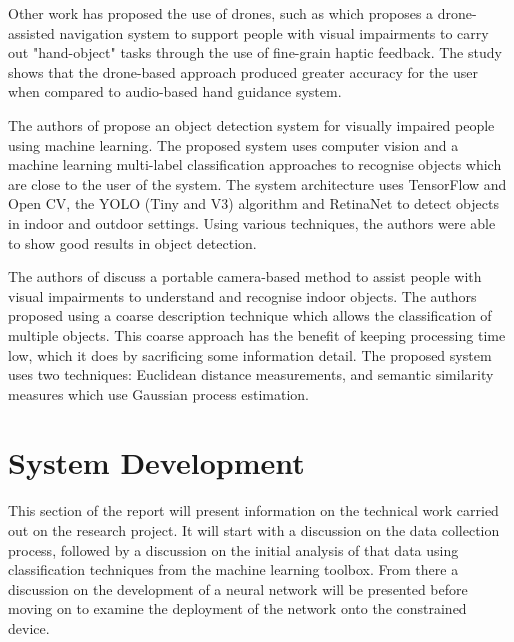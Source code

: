 \documentclass[conference]{IEEEtran}
\begin{document}
Other work has proposed the use of drones, such as \cite{b23} which proposes a drone-assisted navigation system to support people with visual impairments to carry out "hand-object" tasks through the use of fine-grain haptic feedback. The study shows that the drone-based approach produced greater accuracy for the user when compared to audio-based hand guidance system. 

The authors of \cite{b24} propose an object detection system for visually impaired people using machine learning. The proposed system uses computer vision and a machine learning multi-label classification approaches to recognise objects which are close to the user of the system. The system architecture uses TensorFlow and Open CV, the YOLO (Tiny and V3) algorithm and RetinaNet to detect objects in indoor and outdoor settings. Using various techniques, the authors were able to show good results in object detection.

The authors of \cite{b25} discuss a portable camera-based method to assist people with visual impairments to understand and recognise indoor objects. The authors proposed using a coarse description technique which allows the classification of multiple objects. This coarse approach has the benefit of keeping processing time low, which it does by sacrificing some information detail. The proposed system uses two techniques: Euclidean distance measurements, and semantic similarity measures which use Gaussian process estimation.

\section{System Development}
This section of the report will present information on the technical work carried out on the research project. It will start with a discussion on the data collection process, followed by a discussion on the initial analysis of that data using classification techniques from the machine learning toolbox. From there a discussion on the development of a neural network will be presented before moving on to examine the deployment of the network onto the constrained device.
\end{document}
